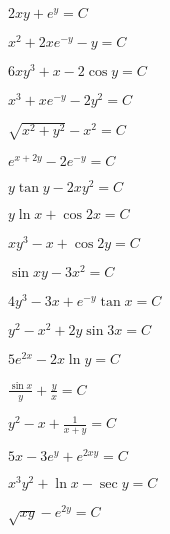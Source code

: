	\label{sol:firstorder:totalderiv}
	\begin{enumsols}

		\item \( 2xy + e^{y} = C \) %
		\item \( x^2 + 2x e^{-y} - y = C \) %
		\item \( 6xy^3 + x - 2 \cos{y} = C \) %
		\item \( x^3 + xe^{-y} - 2y^2 = C \) %
		\item \( \sqrt{x^2 + y^2} - x^2 = C \) %
		\item \( e^{x + 2y} - 2e^{-y} = C \) %
		\item \( y \tan{y} - 2xy^2 = C \) %
		\item \( y \ln{x} + \cos{2x} = C \) %
		\item \( xy^3 - x + \cos{2y} = C \) %
		\item \( \sin{xy} - 3x^2 = C \) %
		\item \( 4y^3 - 3x + e^{-y} \tan{x} = C \) %
		\item \( y^2 - x^2 + 2y \sin{3x} = C \) %
		\item \( 5e^{2x} - 2x \ln{y} = C \) %
		\item \( \frac{\sin{x}}{y} + \frac{y}{x} = C \) %
		\item \( y^2 - x + \frac{1}{x + y} = C \) %
		\item \( 5x - 3e^{y} + e^{2xy} = C \) %
		\item \( x^3 y^2 + \ln{x} - \sec{y} = C \) %
		\item \( \sqrt{xy} - e^{2y} = C \) %

\end{enumsols}
